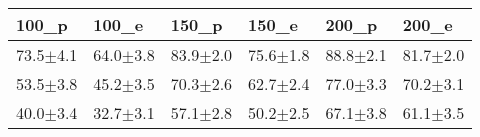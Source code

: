 \begin{tabular}{llllll}
\toprule
100_p & 100_e & 150_p & 150_e & 200_p & 200_e \\
\midrule
73.5$\pm$4.1 & 64.0$\pm$3.8 & 83.9$\pm$2.0 & 75.6$\pm$1.8 & 88.8$\pm$2.1 & 81.7$\pm$2.0 \\
53.5$\pm$3.8 & 45.2$\pm$3.5 & 70.3$\pm$2.6 & 62.7$\pm$2.4 & 77.0$\pm$3.3 & 70.2$\pm$3.1 \\
40.0$\pm$3.4 & 32.7$\pm$3.1 & 57.1$\pm$2.8 & 50.2$\pm$2.5 & 67.1$\pm$3.8 & 61.1$\pm$3.5 \\
\bottomrule
\end{tabular}
